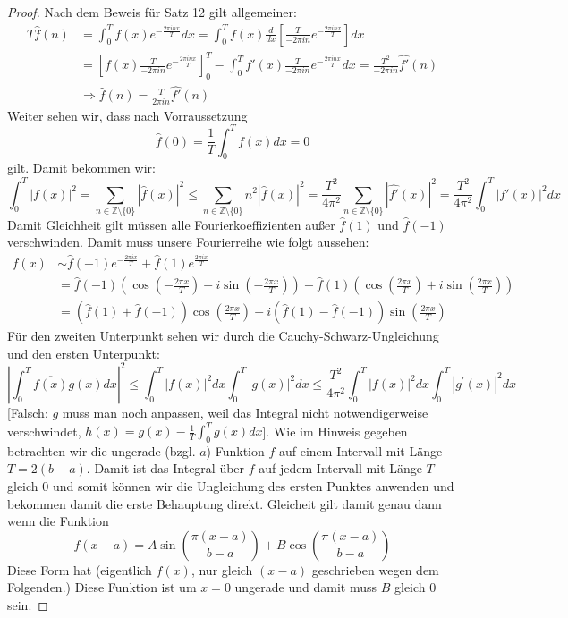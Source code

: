 \documentclass[11pt]{article}
\newcommand{\Z}{\mathbb{Z}}
\begin{document}
    \begin{proof}
        Nach dem Beweis für Satz 12 gilt allgemeiner:
        $$\begin{aligned}
              T\hat{f}(n) &= \int_0^T f(x)e^{-\frac{2\pi inx}{T}}dx =
              \int_0^T f(x)\frac{d}{dx}\left[\frac{T}{-2\pi in} e^{-\frac{2\pi inx}{T}}\right]dx\\
              &= \left[f(x)\frac{T}{-2\pi in}e^{-\frac{2\pi inx}{T}}\right]_0^T -
              \int_0^T f'(x)\frac{T}{-2\pi in} e^{-\frac{2\pi inx}{T}}dx =\frac{T^2}{-2\pi in}\hat{f'}(n)\\
              &\Rightarrow \hat{f}(n) = \frac{T}{2\pi in}\hat{f'}(n)
        \end{aligned}$$
        Weiter sehen wir, dass nach Vorraussetzung
        $$\hat{f}(0) = \frac{1}{T}\int_0^T f(x)dx = 0$$
        gilt. Damit bekommen wir:
        $$\int_0^T |f(x)|^2 =\sum_{n\in\Z\setminus\{0\}} |\hat{f}(x)|^2 \leq
        \sum_{n\in\Z\setminus\{0\}}n^2 |\hat{f}(x)|^2 =\frac{T^2}{4\pi^2}
        \sum_{n\in\Z\setminus\{0\}} |\hat{f'}(x)|^2 =\frac{T^2}{4\pi^2}\int_0^T |f'(x)|^2 dx$$
        Damit Gleichheit gilt müssen alle Fourierkoeffizienten außer $\hat{f}(1)$ und $\hat{f}(-1)$
        verschwinden. Damit muss unsere Fourierreihe wie folgt aussehen:
        $$\begin{aligned}
              f(x)&\sim \hat{f}(-1)e^{-\frac{2\pi ix}{T}} + \hat{f}(1)e^{\frac{2\pi ix}{T}}\\
              &= \hat{f}(-1)\left(\cos\left(-\frac{2\pi x}{T}\right)+i\sin\left(-\frac{2\pi x}{T}
              \right)\right)+\hat{f}(1)\left(\cos\left(\frac{2\pi x}{T}\right)+i\sin\left(\frac{2\pi x}{T}
              \right)\right)\\
              &= (\hat{f}(1)+\hat{f}(-1))\cos\left(\frac{2\pi x}{T}\right) +
              i(\hat{f}(1)-\hat{f}(-1))\sin\left(\frac{2\pi x}{T}\right)
        \end{aligned}$$
        Für den zweiten Unterpunkt sehen wir durch die Cauchy-Schwarz-Ungleichung und
        den ersten Unterpunkt:
        $$\left|\int_0^T \overline{f(x)} g(x) d x\right|^2\leq
        \int_0^T|f(x)|^2 d x \int_0^T\left|g(x)\right|^2 d x
        \leq \frac{T^2}{4 \pi^2} \int_0^T
        |f(x)|^2 d x \int_0^T\left|g^{\prime}(x)\right|^2 d x$$
        [Falsch: $g$ muss man noch anpassen, weil das Integral nicht
        notwendigerweise verschwindet, $h(x)=g(x)-\frac{1}{T}\int_0^T g(x)dx$].
        Wie im Hinweis gegeben betrachten wir die ungerade (bzgl. $a$)
        Funktion $f$ auf einem Intervall mit Länge $T=2(b-a)$. Damit
        ist das Integral über $f$ auf jedem Intervall mit Länge
        $T$ gleich $0$ und somit können wir die Ungleichung des ersten
        Punktes anwenden und bekommen damit die erste Behauptung direkt.
        Gleicheit gilt damit genau dann wenn die Funktion
        $$f(x-a)=A\sin\left(\frac{\pi (x-a)}{b-a}\right)+ B
        \cos\left(\frac{\pi (x-a)}{b-a}\right)$$
        Diese Form hat (eigentlich $f(x)$, nur gleich $(x-a)$ geschrieben wegen dem Folgenden.)
        Diese Funktion ist um $x=0$ ungerade und damit muss $B$ gleich $0$ sein.
    \end{proof}
\end{document}
